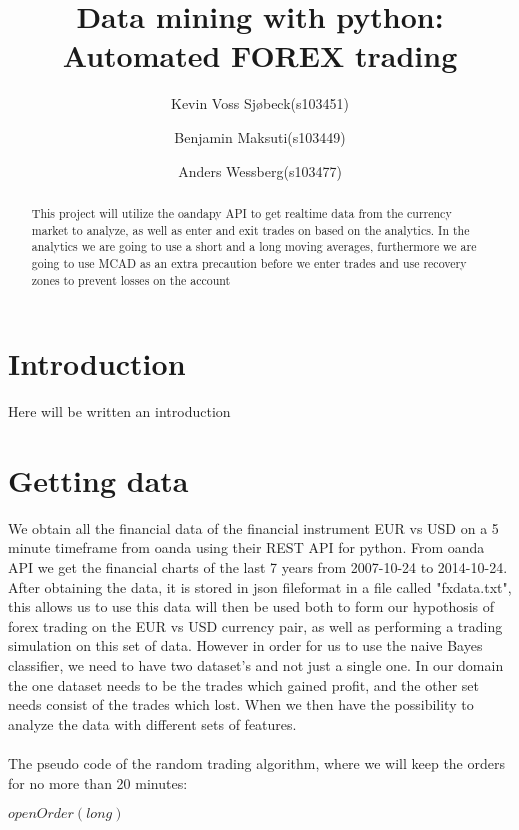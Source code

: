 \documentclass[10pt]{IEEEtran}
\title{Data mining with python: \\Automated FOREX trading}
\author{
	Kevin Voss Sjøbeck(s103451)\\
	\and
	Benjamin Maksuti(s103449)\\
	\and
	Anders Wessberg(s103477)
}
\begin{document}
\maketitle

\begin{abstract}
This project will utilize the oandapy API to get realtime data from the currency market to analyze, as well as enter and exit trades on based on the analytics. In the analytics we are going to use a short and a long moving averages, furthermore we are going to use MCAD as an extra precaution before we enter trades and use recovery zones to prevent losses on the account
\end{abstract}

\section{Introduction}
Here will be written an introduction


\section{Getting data}
We obtain all the financial data of the financial instrument EUR vs USD on a 5 minute timeframe from oanda using their REST API for python. From oanda API we get the financial charts of the last 7 years from 2007-10-24 to 2014-10-24. After obtaining the data, it is stored in json fileformat in a file called "fxdata.txt", this allows us to use this data will then be used both to form our hypothosis of forex trading on the EUR vs USD currency pair, as well as performing a trading simulation on this set of data. However in order for us to use the naive Bayes classifier, we need to have two dataset's and not just a single one. In our domain the one dataset needs to be the trades which gained profit, and the other set needs consist of the trades which lost. When we then have the possibility to analyze the data with different sets of features.\\
\\
The pseudo code of the random trading algorithm, where we will keep the orders for no more than 20 minutes:

\begin{center}
\begin{algorithmic}
    	\State $openOrder(long)$	    
	\EndIf
		\Else
		\EndIf
	\EndFor
\EndWhile
{}
\end{algorithmic}
\end{center}
\end{document}
